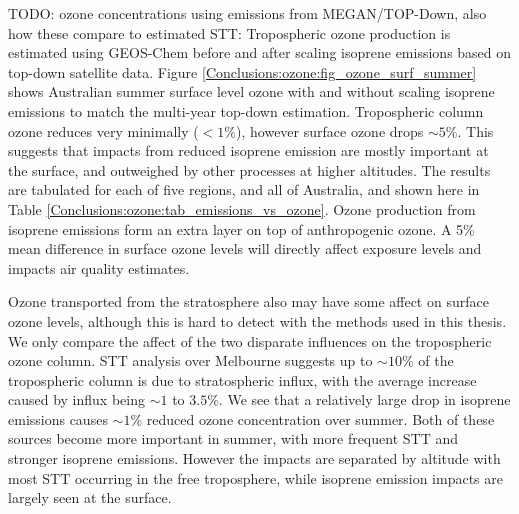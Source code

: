   TODO: ozone concentrations using emissions from MEGAN/TOP-Down, also how these compare to estimated STT:
  Tropospheric ozone production is estimated using GEOS-Chem before and after scaling isoprene emissions based on top-down satellite data.
  Figure \ref{Conclusions:ozone:fig_ozone_surf_summer} shows Australian summer surface level ozone with and without scaling isoprene emissions to match the multi-year top-down estimation.
  Tropospheric column ozone reduces very minimally ($<1\%$), however surface ozone drops $\sim 5\%$.
  This suggests that impacts from reduced isoprene emission are mostly important at the surface, and outweighed by other processes at higher altitudes.
  The results are tabulated for each of five regions, and all of Australia, and shown here in Table \ref{Conclusions:ozone:tab_emissions_vs_ozone}.
  Ozone production from isoprene emissions form an extra layer on top of anthropogenic ozone. 
  A 5\% mean difference in surface ozone levels will directly affect exposure levels and impacts air quality estimates. 
  
  Ozone transported from the stratosphere also may have some affect on surface ozone levels, although this is hard to detect with the methods used in this thesis.
  We only compare the affect of the two disparate influences on the tropospheric ozone column.
  STT analysis over Melbourne suggests up to $\sim 10\%$ of the tropospheric column is due to stratospheric influx, with the average increase caused by influx being $\sim 1$ to $3.5\%$.
  We see that a relatively large drop in isoprene emissions causes $\sim 1\%$ reduced ozone concentration over summer.
  Both of these sources become more important in summer, with more frequent STT and stronger isoprene emissions.
  However the impacts are separated by altitude with most STT occurring in the free troposphere, while isoprene emission impacts are largely seen at the surface.
  
  

